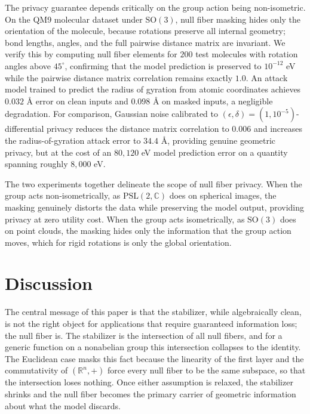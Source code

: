 \documentclass[11pt]{article}
\newcommand{\CC}{\mathbb{C}}
\newcommand{\RR}{\mathbb{R}}
\begin{document}
The privacy guarantee depends critically on the group action being non-isometric. On the QM9 molecular dataset under $\mathrm{SO}(3)$, null fiber masking hides only the orientation of the molecule, because rotations preserve all internal geometry; bond lengths, angles, and the full pairwise distance matrix are invariant. We verify this by computing null fiber elements for $200$ test molecules with rotation angles above $45^\circ$, confirming that the model prediction is preserved to $10^{-12}$ eV while the pairwise distance matrix correlation remains exactly $1.0$. An attack model trained to predict the radius of gyration from atomic coordinates achieves $0.032$ \AA{} error on clean inputs and $0.098$ \AA{} on masked inputs, a negligible degradation. For comparison, Gaussian noise calibrated to $(\epsilon, \delta) = (1, 10^{-5})$-differential privacy reduces the distance matrix correlation to $0.006$ and increases the radius-of-gyration attack error to $34.4$ \AA, providing genuine geometric privacy, but at the cost of an $80{,}120$ eV model prediction error on a quantity spanning roughly $8{,}000$ eV.

The two experiments together delineate the scope of null fiber privacy. When the group acts non-isometrically, as $\mathrm{PSL}(2, \CC)$ does on spherical images, the masking genuinely distorts the data while preserving the model output, providing privacy at zero utility cost. When the group acts isometrically, as $\mathrm{SO}(3)$ does on point clouds, the masking hides only the information that the group action moves, which for rigid rotations is only the global orientation.

\section{Discussion}\label{sec:discussion}

The central message of this paper is that the stabilizer, while algebraically clean, is not the right object for applications that require guaranteed information loss; the null fiber is. The stabilizer is the intersection of all null fibers, and for a generic function on a nonabelian group this intersection collapses to the identity. The Euclidean case masks this fact because the linearity of the first layer and the commutativity of $(\RR^n, +)$ force every null fiber to be the same subspace, so that the intersection loses nothing. Once either assumption is relaxed, the stabilizer shrinks and the null fiber becomes the primary carrier of geometric information about what the model discards.
\end{document}
